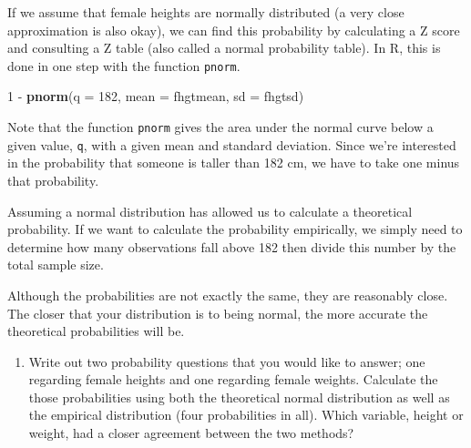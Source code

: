 \documentclass[]{book}
\newenvironment{Shaded}{\begin{snugshade}}{\end{snugshade}}
\newcommand{\KeywordTok}[1]{\textcolor[rgb]{0.13,0.29,0.53}{\textbf{{#1}}}}
\newcommand{\DataTypeTok}[1]{\textcolor[rgb]{0.13,0.29,0.53}{{#1}}}
\newcommand{\DecValTok}[1]{\textcolor[rgb]{0.00,0.00,0.81}{{#1}}}
\newcommand{\StringTok}[1]{\textcolor[rgb]{0.31,0.60,0.02}{{#1}}}
\newcommand{\NormalTok}[1]{{#1}}
\providecommand{\tightlist}{%
  \setlength{\itemsep}{0pt}\setlength{\parskip}{0pt}}
\theoremstyle{definition}
\theoremstyle{definition}
\theoremstyle{remark}
\begin{document}
If we assume that female heights are normally distributed (a very close
approximation is also okay), we can find this probability by calculating
a Z score and consulting a Z table (also called a normal probability
table). In R, this is done in one step with the function \texttt{pnorm}.

\begin{Shaded}
\begin{Highlighting}[]
\DecValTok{1} \NormalTok{-}\StringTok{ }\KeywordTok{pnorm}\NormalTok{(}\DataTypeTok{q =} \DecValTok{182}\NormalTok{, }\DataTypeTok{mean =} \NormalTok{fhgtmean, }\DataTypeTok{sd =} \NormalTok{fhgtsd)}
\end{Highlighting}
\end{Shaded}

Note that the function \texttt{pnorm} gives the area under the normal
curve below a given value, \texttt{q}, with a given mean and standard
deviation. Since we're interested in the probability that someone is
taller than 182 cm, we have to take one minus that probability.

Assuming a normal distribution has allowed us to calculate a theoretical
probability. If we want to calculate the probability empirically, we
simply need to determine how many observations fall above 182 then
divide this number by the total sample size.

\begin{Shaded}
\end{Shaded}

Although the probabilities are not exactly the same, they are reasonably
close. The closer that your distribution is to being normal, the more
accurate the theoretical probabilities will be.

\begin{enumerate}
\def\labelenumi{\arabic{enumi}.}
\setcounter{enumi}{5}
\tightlist
\item
  Write out two probability questions that you would like to answer; one
  regarding female heights and one regarding female weights. Calculate
  the those probabilities using both the theoretical normal distribution
  as well as the empirical distribution (four probabilities in all).
  Which variable, height or weight, had a closer agreement between the
  two methods?
\end{enumerate}
\end{document}
